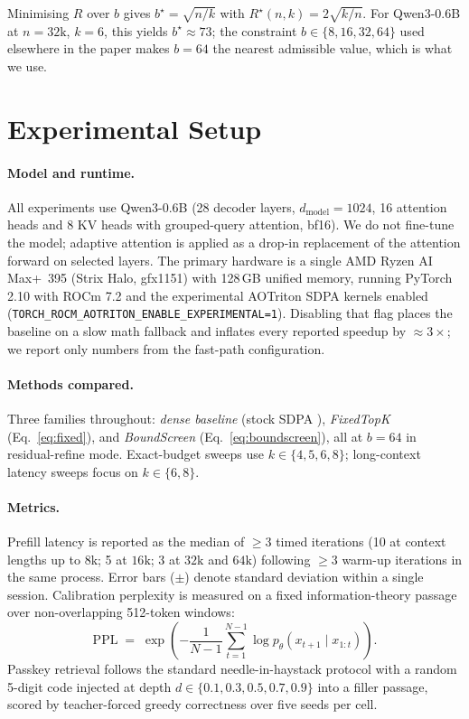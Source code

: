 \documentclass[11pt]{article}
\theoremstyle{plain}
\theoremstyle{definition}
\begin{document}
Minimising $R$ over $b$ gives $b^{\star} = \sqrt{n/k}$ with
$R^{\star}(n, k) = 2\sqrt{k/n}$. For Qwen3-0.6B at $n = 32\mathrm{k}$,
$k = 6$, this yields $b^{\star} \approx 73$; the constraint
$b \in \{8, 16, 32, 64\}$ used elsewhere in the paper makes $b = 64$ the
nearest admissible value, which is what we use.

\section{Experimental Setup}
\label{sec:setup}

\paragraph{Model and runtime.}
All experiments use Qwen3-0.6B \citep{qwen3} (28 decoder layers,
$d_{\text{model}} = 1024$, 16 attention heads and 8 KV heads with
grouped-query attention, bf16). We do not fine-tune the model; adaptive
attention is applied as a drop-in replacement of the attention forward on
selected layers. The primary hardware is a single AMD Ryzen AI Max+~395
(Strix Halo, gfx1151) with 128\,GB unified memory, running PyTorch 2.10
with ROCm 7.2 and the experimental AOTriton SDPA kernels enabled
(\texttt{TORCH\_ROCM\_AOTRITON\_ENABLE\_EXPERIMENTAL=1}). Disabling that
flag places the baseline on a slow math fallback and inflates every
reported speedup by $\approx 3\times$; we report only numbers from the
fast-path configuration.

\paragraph{Methods compared.}
Three families throughout: \emph{dense baseline} (stock SDPA
\citep{dao2022flashattention}), \emph{FixedTopK} (Eq.~\ref{eq:fixed}),
and \emph{BoundScreen} (Eq.~\ref{eq:boundscreen}), all at $b = 64$ in
residual-refine mode. Exact-budget sweeps use $k \in \{4, 5, 6, 8\}$;
long-context latency sweeps focus on $k \in \{6, 8\}$.

\paragraph{Metrics.}
Prefill latency is reported as the median of $\ge 3$ timed iterations
(10 at context lengths up to $8\mathrm{k}$; 5 at $16\mathrm{k}$; 3 at
$32\mathrm{k}$ and $64\mathrm{k}$) following $\ge 3$ warm-up iterations in
the same process. Error bars ($\pm$) denote standard deviation within a
single session. Calibration perplexity is measured on a fixed
information-theory passage over non-overlapping 512-token windows:
\begin{equation}
\mathrm{PPL} \;=\; \exp\!\left( -\frac{1}{N - 1} \sum_{t=1}^{N - 1} \log p_\theta(x_{t+1} \mid x_{1:t}) \right).
\end{equation}
Passkey retrieval follows the standard needle-in-haystack
protocol \citep{liu2023lost} with a random 5-digit code injected at depth
$d \in \{0.1, 0.3, 0.5, 0.7, 0.9\}$ into a filler passage, scored by
teacher-forced greedy correctness over five seeds per cell.
\end{document}
